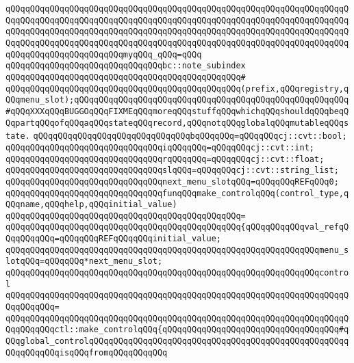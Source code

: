 \verb|qQQqqQQqqQQqqQQqqQQqqQQqqQQqqQQqqQQqqQQqqQQqqQQqqQQqqQQqqQQqqQQqqQQqqQQqqQQqqQQqqQQqqQQqqQQqqQQqqQQqqQQqqQQqqQQqqQQqqQQqqQQqqQQqqQQqqQQqqQQqqQQqqQQqqQQqqQQqqQQqqQQqqQQqqQQqqQQqqQQqqQQqqQQqqQQqqQQqqQQqqQQqqQQqqQQqqQQqqQQqqQQqqQQqqQQqqQQqqQQqqQQqqQQqqQQqqQQqqQQqqQQqqQQqqQQqqQQqqQQqqQQqqQQqqQQqqQQqqQQqqQQqmyqQQq_qQQq=qQQq|\newline
\verb|qQQqqQQqqQQqqQQqqQQqqQQqqQQqqQQqbc::note_subindex|\newline
\verb|qQQqqQQqqQQqqQQqqQQqqQQqqQQqqQQqqQQqqQQqqQQqqQQq#|\newline
\verb|qQQqqQQqqQQqqQQqqQQqqQQqqQQqqQQqqQQqqQQqqQQqqQQq(prefix,qQQqregistry,qQQqmenu_slot);qQQqqQQqqQQqqQQqqQQqqQQqqQQqqQQqqQQqqQQqqQQqqQQqqQQqqQQq#qQQqXXXqQQqBUGGOqQQqFIXMEqQQqmoreqQQqstuffqQQqwhichqQQqshouldqQQqbeqQQqpartqQQqofqQQqaqQQqstateqQQqrecord,qQQqnotqQQqglobalqQQqmutableqQQqstate.|\newline
\newline
\verb|qQQqqQQqqQQqqQQqqQQqqQQqqQQqqQQqbqQQqqQQq=qQQqqQQqcj::cvt::bool;|\newline
\verb|qQQqqQQqqQQqqQQqqQQqqQQqqQQqqQQqiqQQqqQQq=qQQqqQQqcj::cvt::int;|\newline
\verb|qQQqqQQqqQQqqQQqqQQqqQQqqQQqqQQqrqQQqqQQq=qQQqqQQqcj::cvt::float;|\newline
\verb|qQQqqQQqqQQqqQQqqQQqqQQqqQQqqQQqslqQQq=qQQqqQQqcj::cvt::string_list;|\newline
\newline
\verb|qQQqqQQqqQQqqQQqqQQqqQQqqQQqqQQqnext_menu_slotqQQq=qQQqqQQqREFqQQq0;|\newline
\newline
\verb|qQQqqQQqqQQqqQQqqQQqqQQqqQQqqQQqfunqQQqmake_controlqQQq(control_type,qQQqname,qQQqhelp,qQQqinitial_value)|\newline
\verb|qQQqqQQqqQQqqQQqqQQqqQQqqQQqqQQqqQQqqQQqqQQqqQQq=|\newline
\verb|qQQqqQQqqQQqqQQqqQQqqQQqqQQqqQQqqQQqqQQqqQQqqQQq{qQQqqQQqqQQqval_refqQQqqQQqqQQq=qQQqqQQqREFqQQqqQQqinitial_value;|\newline
\verb|qQQqqQQqqQQqqQQqqQQqqQQqqQQqqQQqqQQqqQQqqQQqqQQqqQQqqQQqqQQqqQQqmenu_slotqQQq=qQQqqQQq*next_menu_slot;|\newline
\newline
\verb|qQQqqQQqqQQqqQQqqQQqqQQqqQQqqQQqqQQqqQQqqQQqqQQqqQQqqQQqqQQqqQQqcontrol|\newline
\verb|qQQqqQQqqQQqqQQqqQQqqQQqqQQqqQQqqQQqqQQqqQQqqQQqqQQqqQQqqQQqqQQqqQQqqQQqqQQqqQQq=|\newline
\verb|qQQqqQQqqQQqqQQqqQQqqQQqqQQqqQQqqQQqqQQqqQQqqQQqqQQqqQQqqQQqqQQqqQQqqQQqqQQqqQQqctl::make_controlqQQq{qQQqqQQqqQQqqQQqqQQqqQQqqQQqqQQqqQQq#qQQqglobal_controlqQQqqQQqqQQqqQQqqQQqqQQqqQQqqQQqqQQqqQQqqQQqqQQqqQQqqQQqqQQqqQQqisqQQqfromqQQqqQQqqQQq|\newline
